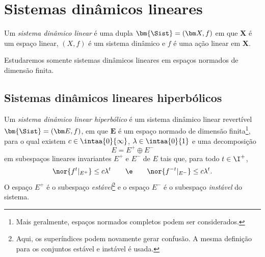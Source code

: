 \chapter{Sistemas dinâmicos lineares}

\begin{definition}
Um \emph{sistema dinâmico linear} é uma dupla $\bm{\Sist}=(\bm X,f)$ em que $\bm X$ é um espaço linear, $(X,f)$ é um sistema dinâmico e $f$ é uma ação linear em $\bm X$.
\end{definition}


Estudaremos somente sistemas dinâmicos lineares em espaços normados de dimensão finita.

\section{Sistemas dinâmicos lineares hiperbólicos}

\begin{definition}
Um \emph{sistema dinâmico linear hiperbólico} é um sistema dinâmico linear revertível $\bm{\Sist}=(\bm E,f)$, em que $\bm E$ é um espaço normado de dimensão finita\footnote{Mais geralmente, espaços normados completos podem ser considerados.}, para o qual existem $c \in \intaa{0}{\infty}$, $\lambda \in \intaa{0}{1}$ e
uma decomposição
	\begin{equation*}
	E = E^+ \oplus E^-
	\end{equation*}
em subespaços lineares invariantes $E^+$ e $E^-$ de $E$ tais que, para todo $t \in \I^+$,
	\begin{equation*}
	\nor{f^t|_{E^+}} \leq c\lambda^t \qquad\e\qquad \nor{f^{-t}|_{E^-}} \leq c\lambda^t.
	\end{equation*}
O espaço $E^+$ é o subespaço \emph{estável}\footnote{Aqui, os superíndices podem novamente gerar confusão. A mesma definição para os conjuntos estável e instável é usada.} e o espaço $E^-$ é o subespaço \emph{instável} do sistema.
\end{definition}

